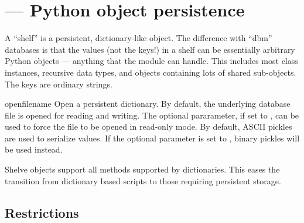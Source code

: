 \section{ ---
         Python object persistence}



A ``shelf'' is a persistent, dictionary-like object.  The difference
with ``dbm'' databases is that the values (not the keys!) in a shelf
can be essentially arbitrary Python objects --- anything that the
 module can handle.  This includes most class
instances, recursive data types, and objects containing lots of shared 
sub-objects.  The keys are ordinary strings.

\begin{funcdesc}{open}{filename}
Open a persistent dictionary.  By default, the underlying database file is
opened for reading and writing.  The optional  pararameter, if set
to , can be used to force the file to be opened in read-only mode.
By default, ASCII pickles are used to serialize values.  If the optional
{} parameter is set to , binary pickles will be used
instead.
\end{funcdesc}

Shelve objects support all methods supported by dictionaries.  This eases
the transition from dictionary based scripts to those requiring persistent
storage.

\subsection{Restrictions}

